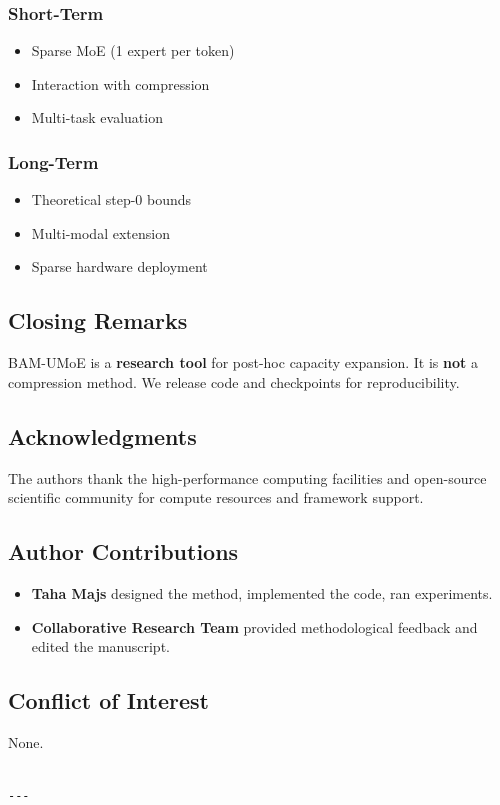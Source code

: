 \subsubsection{Short-Term}
\begin{itemize}
\item Sparse MoE (1 expert per token)
\item Interaction with compression
\item Multi-task evaluation

\end{itemize}
\subsubsection{Long-Term}
\begin{itemize}
\item Theoretical step-0 bounds
\item Multi-modal extension
\item Sparse hardware deployment

\end{itemize}
\subsection{Closing Remarks}

BAM-UMoE is a \textbf{research tool} for post-hoc capacity expansion. It is 
\textbf{not} a compression method. We release code and checkpoints for 
reproducibility.

\subsection{Acknowledgments}

The authors thank the high-performance computing facilities and open-source scientific community for compute resources and framework support.

\subsection{Author Contributions}

\begin{itemize}
\item \textbf{Taha Majs} designed the method, implemented the code, ran experiments.
\item \textbf{Collaborative Research Team} provided methodological feedback and edited the manuscript.

\end{itemize}
\subsection{Conflict of Interest}

None.
\begin{lstlisting}

---
\end{lstlisting}